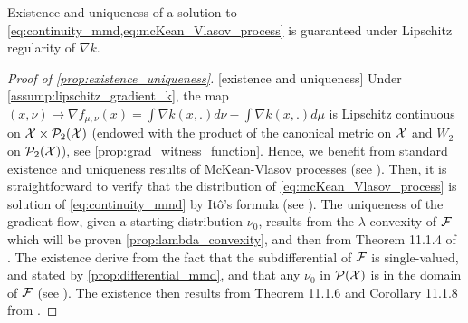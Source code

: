 
Existence and uniqueness of a solution to \cref{eq:continuity_mmd,eq:mcKean_Vlasov_process} is guaranteed under Lipschitz regularity of $\nabla k$.%
\begin{proof}[Proof of \cref{prop:existence_uniqueness}]\label{proof:prop:existence_uniqueness}[existence and uniqueness]
Under \cref{assump:lipschitz_gradient_k}, the map $(x,\nu)\mapsto \nabla f_{\mu,\nu}(x)=\int \nabla k(x,.)d \nu - \int \nabla k(x,.) d \mu$ is Lipschitz continuous on ${{\mathcal X}} \times \mathcal{P}_2({{\mathcal X}})$ (endowed with the product of the canonical metric on ${{\mathcal X}}$ and $W_2$ on $\mathcal{P}_2({{\mathcal X}})$), see \cref{prop:grad_witness_function}. Hence, we benefit from standard existence and uniqueness results of McKean-Vlasov processes (see \cite{jourdain2007nonlinear}). Then, it is straightforward to verify that the distribution of \eqref{eq:mcKean_Vlasov_process} is solution of \eqref{eq:continuity_mmd} by Itô's formula (see \cite{ito1951stochastic}). The uniqueness of the gradient flow, given a starting distribution $\nu_0$, results from the $\lambda$-convexity of ${{\mathcal F}}$ which will be proven \cref{prop:lambda_convexity}, and then from Theorem 11.1.4 of \cite{ambrosio2008gradient}. The existence derive from the fact that the subdifferential of ${{\mathcal F}}$ is single-valued, and stated by \cref{prop:differential_mmd}, and that any $\nu_0$ in $\mathcal{P}({{\mathcal X}})$ is in the domain of ${{\mathcal F}}$ (see \cite{gretton2012kernel}). The existence then results from Theorem 11.1.6 and Corollary 11.1.8 from \cite{ambrosio2008gradient}.
\end{proof}

